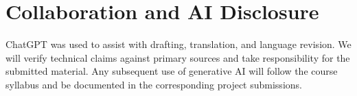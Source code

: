 \section{Collaboration and AI Disclosure}

ChatGPT was used to assist with drafting, translation, and language revision. We will verify technical claims against primary sources and take responsibility for the submitted material. Any subsequent use of generative AI will follow the course syllabus and be documented in the corresponding project submissions.